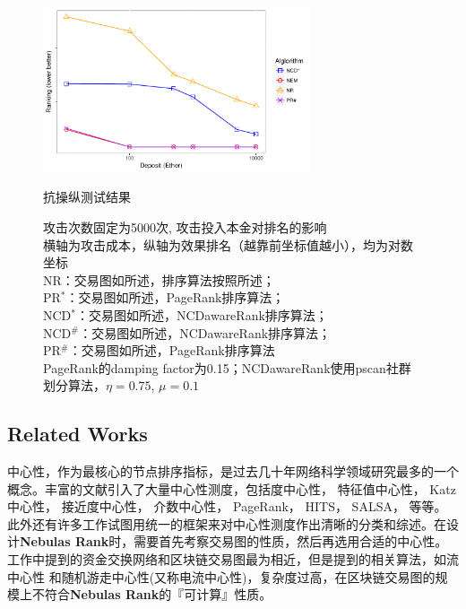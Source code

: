 \begin{figure}[!htbp]
	\centering
	\includegraphics[width=0.7\textwidth]{figs/AttackDeposit.pdf}
	\caption{抗操纵测试结果 }
	\label{fig:antiManipulation}
	\caption*{\footnotesize{攻击次数固定为5000次, 攻击投入本金对排名的影响 \\ 横轴为攻击成本，纵轴为效果排名（越靠前坐标值越小），均为对数坐标 \\
	NR：交易图如所述，排序算法按照所述；\\PR$^*$：交易图如所述，PageRank排序算法；\\ NCD$^*$：交易图如所述，NCDawareRank排序算法；\\ NCD$^{\#}$：交易图如\cite{nem}所述，NCDawareRank排序算法；\\ PR$^{\#}$：交易图如\cite{nem}所述，PageRank排序算法 \\ PageRank的damping factor为0.15；NCDawareRank使用pscan\cite{chang2017mathsf}社群划分算法，$\eta=0.75$, $\mu=0.1$}}
\end{figure}

\subsection{Related Works} \label{subsec:related}
中心性，作为最核心的节点排序指标，是过去几十年网络科学领域研究最多的一个概念\cite{newman2010networks}。丰富的文献引入了大量中心性测度，包括度中心性\cite{freeman1979set}， 特征值中心性\cite{bonacich1972factoring}， Katz中心性\cite{katz1953new}， 接近度中心性\cite{sabidussi1966centrality}， 介数中心性\cite{freeman1977set}\cite{freeman1978centrality}\cite{freeman1991centrality}\cite{noh2004random}\cite{newman2005measure}， PageRank\cite{Brin2010}， HITS\cite{kleinberg1999authoritative}， SALSA\cite{Science2001}， 等等。此外还有许多工作试图用统一的框架来对中心性测度作出清晰的分类和综述\cite{Borgatti2005}\cite{Borgatti2006}\cite{Lu2016}。在设计\textbf{Nebulas Rank}时，需要首先考察交易图的性质，然后再选用合适的中心性。\textcite{Borgatti2005}工作中提到的资金交换网络和区块链交易图最为相近，但是提到的相关算法，如流中心性\cite{freeman1991centrality} 和随机游走中心性(又称电流中心性)\cite{newman2005measure}，复杂度过高，在区块链交易图的规模上不符合\textbf{Nebulas Rank}的『可计算』性质。

